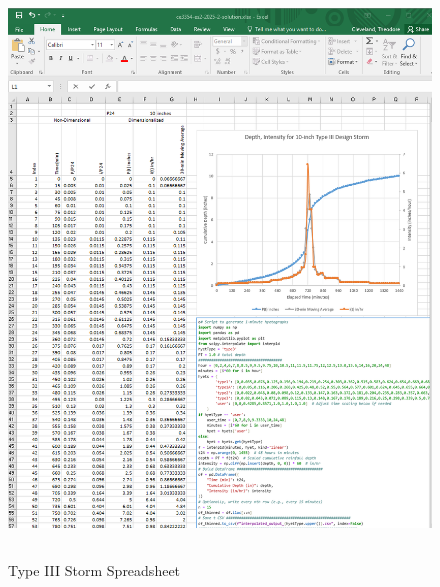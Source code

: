 \documentclass[12pt]{article}
\begin{document}
\begin{enumerate}
\begin{figure}[h!] %
   \centering
   \includegraphics[height=6in]{ES2-6-xls.png} 
   \caption{Type III Storm Spreadsheet}
   \label{fig:es2-6-xls}
\end{figure}

\clearpage


\end{enumerate}
\end{document}
